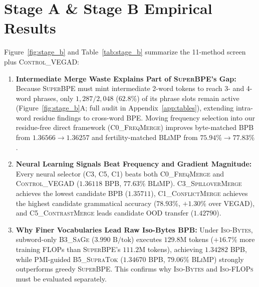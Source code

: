 \documentclass[11pt,a4paper]{article}
\begin{document}
\section{Stage A \& Stage B Empirical Results}
\label{sec:stage_b}
Figure~\ref{fig:stage_b} and Table~\ref{tab:stage_b} summarize the 11-method screen plus \textsc{Control\_VEGAD}:
\begin{enumerate}
    \item \textbf{Intermediate Merge Waste Explains Part of \textsc{SuperBPE}'s Gap:} Because \textsc{SuperBPE} must mint intermediate 2-word tokens to reach 3- and 4-word phrases, only $1{,}287/2{,}048$ ($62.8\%$) of its phrase slots remain active (Figure~\ref{fig:stage_b}A; full audit in Appendix~\ref{app:tables}), extending intra-word residue findings \citep{yang2026litetoken} to cross-word BPE. Moving frequency selection into our residue-free direct framework (\textsc{C0\_FreqMerge}) improves byte-matched BPB from $1.36566 \to 1.36257$ and fertility-matched \textsc{BLiMP} from $75.94\% \to 77.83\%$.
    \item \textbf{Neural Learning Signals Beat Frequency and Gradient Magnitude:} Every neural selector (\textsc{C3}, \textsc{C5}, \textsc{C1}) beats both \textsc{C0\_FreqMerge} and \textsc{Control\_VEGAD} ($1.36118$ BPB, $77.63\%$ \textsc{BLiMP}). \textsc{C3\_SpilloverMerge} achieves the lowest candidate BPB ($1.35711$), \textsc{C1\_ConflictMerge} achieves the highest candidate grammatical accuracy ($78.93\%$, $+1.30\%$ over \textsc{VEGAD}), and \textsc{C5\_ContrastMerge} leads candidate OOD transfer ($1.42790$).
    \item \textbf{Why Finer Vocabularies Lead Raw Iso-Bytes BPB:} Under \textsc{Iso-Bytes}, subword-only \textsc{B3\_SaGe} ($3.990\text{ B/tok}$) executes $129.8\text{M}$ tokens ($+16.7\%$ more training FLOPs than \textsc{SuperBPE}'s $111.2\text{M}$ tokens), achieving $1.34282$ BPB, while PMI-guided \textsc{B5\_Supra\-Tok} ($1.34670$ BPB, $79.06\%$ \textsc{BLiMP}) strongly outperforms greedy \textsc{SuperBPE}. This confirms why \textsc{Iso-Bytes} and \textsc{Iso-FLOPs} must be evaluated separately.
\end{enumerate}
\end{document}
